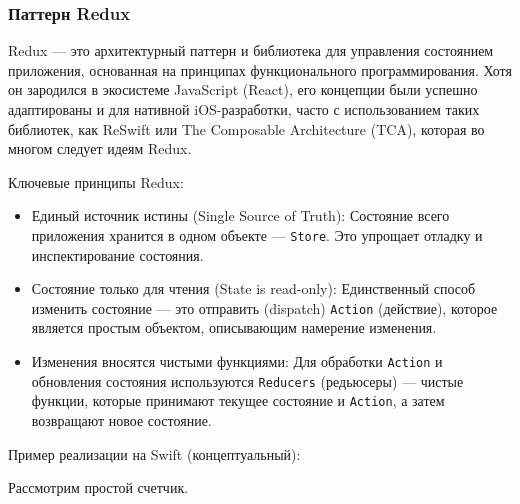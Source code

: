 \documentclass[14pt, russian]{scrartcl}
\begin{document}
\subsubsection{Паттерн Redux}

Redux — это архитектурный паттерн и библиотека для управления состоянием приложения, основанная на принципах функционального программирования. Хотя он зародился в экосистеме JavaScript (React), его концепции были успешно адаптированы и для нативной iOS-разработки, часто с использованием таких библиотек, как ReSwift или The Composable Architecture (TCA), которая во многом следует идеям Redux.

Ключевые принципы Redux:
\begin{itemize}
    \item Единый источник истины (Single Source of Truth): Состояние всего приложения хранится в одном объекте — \texttt{Store}. Это упрощает отладку и инспектирование состояния.
    \item Состояние только для чтения (State is read-only): Единственный способ изменить состояние — это отправить (dispatch) \texttt{Action} (действие), которое является простым объектом, описывающим намерение изменения.
    \item Изменения вносятся чистыми функциями: Для обработки \texttt{Action} и обновления состояния используются \texttt{Reducers} (редьюсеры) — чистые функции, которые принимают текущее состояние и \texttt{Action}, а затем возвращают новое состояние.
\end{itemize}

Пример реализации на Swift (концептуальный):

Рассмотрим простой счетчик.
\end{document}

